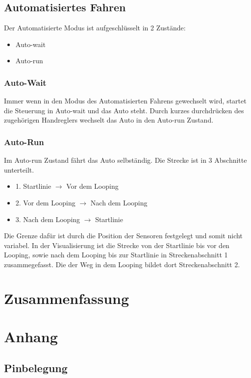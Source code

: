 \documentclass[a4paper, 11pt]{report}
\begin{document}
	\section{Automatisiertes Fahren}
		Der Automatisierte Modus ist aufgeschlüsselt in 2 Zustände:
		\begin{itemize}
			\item Auto-wait
			\item Auto-run
		\end{itemize}
		\subsection{Auto-Wait}
		Immer wenn in den Modus des Automatisierten Fahrens gewechselt wird, startet die Steuerung in
		Auto-wait und das Auto steht.
		Durch kurzes durchdrücken des zugehörigen Handreglers wechselt das Auto in den Auto-run Zustand.
		\subsection{Auto-Run}
			Im Auto-run Zustand fährt das Auto selbständig. Die Strecke ist in 3 Abschnitte unterteilt.
			\begin{itemize}
				\item{1.} Startlinie $\rightarrow$ Vor dem Looping
				\item{2.} Vor dem Looping $\rightarrow$ Nach dem Looping
				\item{3.} Nach dem Looping $\rightarrow$ Startlinie
			\end{itemize}
			Die Grenze dafür ist durch die Position der Sensoren festgelegt und somit nicht variabel.
			In der Visualisierung ist die Strecke von der Startlinie bis vor den Looping, sowie nach dem Looping bis zur Startlinie in Streckenabschnitt 1 zusammegefasst.
			Die der Weg in dem Looping bildet dort Streckenabschnitt 2.




\chapter{Zusammenfassung}




\chapter{Anhang}
\section{Pinbelegung}
\end{document}
